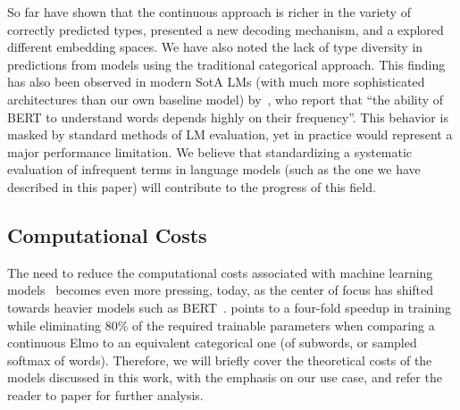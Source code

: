 \documentclass[11pt,a4paper]{article}
\begin{document}
So far have shown that the continuous approach is richer in the variety of correctly predicted types, presented a new decoding mechanism, and a explored different embedding spaces. We have also noted the lack of type diversity in predictions from models using the traditional categorical approach. This finding has also been observed in modern SotA LMs (with much more sophisticated architectures than our own baseline model) by~\citet{schick2019rare}, who report that ``the ability of BERT to understand words depends highly on their frequency''. This behavior is masked by standard methods of LM evaluation, yet in practice would represent a major performance limitation. We believe that standardizing a systematic evaluation of infrequent terms in language models (such as the one we have described in this paper) will contribute to the progress of this field.


\subsection{Computational Costs}

The need to reduce the computational costs associated with machine learning models~\citep{schwartz2019green} becomes even more pressing, today, as the center of focus has shifted towards heavier models such as BERT~\citep{zafrir2019q8bert}.
\citet{li2019efficient} points to a four-fold speedup in training while eliminating $80\%$ of the required trainable parameters when comparing a continuous Elmo to an equivalent categorical one (of subwords, or sampled softmax of words). Therefore, we will briefly cover the theoretical costs of the models discussed in this work, with the emphasis on our use case, and refer the reader to \citet{li2019efficient} paper for further analysis.
\end{document}
